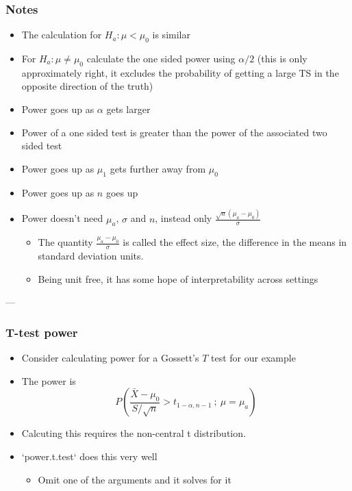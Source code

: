 \documentclass[10pt,article]{article}
\begin{document}
\subsubsection{Notes}
\label{sec:orgcd5e6b9}
\begin{itemize}
\item The calculation for \(H_a:\mu < \mu_0\) is similar
\item For \(H_a: \mu \neq \mu_0\) calculate the one sided power using \(\alpha / 2\) (this is only approximately right, it excludes the probability of getting a large TS in the opposite direction of the truth)
\item Power goes up as \(\alpha\) gets larger
\item Power of a one sided test is greater than the power of the associated two sided test
\item Power goes up as \(\mu_1\) gets further away from \(\mu_0\)
\item Power goes up as \(n\) goes up
\item Power doesn't need \(\mu_a\), \(\sigma\) and \(n\), instead only \(\frac{\sqrt{n}(\mu_a - \mu_0)}{\sigma}\)
\begin{itemize}
\item The quantity \(\frac{\mu_a - \mu_0}{\sigma}\) is called the effect size, the difference in the means in standard deviation units.
\item Being unit free, it has some hope of interpretability across settings
\end{itemize}
\end{itemize}

---
\subsubsection{T-test power}
\label{sec:orgb648a41}
\begin{itemize}
\item Consider calculating power for a Gossett's \(T\) test for our example
\item The power is
$$
  P\left(\frac{\bar X - \mu_0}{S /\sqrt{n}} > t_{1-\alpha, n-1} ~;~ \mu = \mu_a \right)
  $$
\item Calcuting this requires the non-central t distribution.
\item `power.t.test` does this very well
\begin{itemize}
\item Omit one of the arguments and it solves for it
\end{itemize}
\end{itemize}
\end{document}

